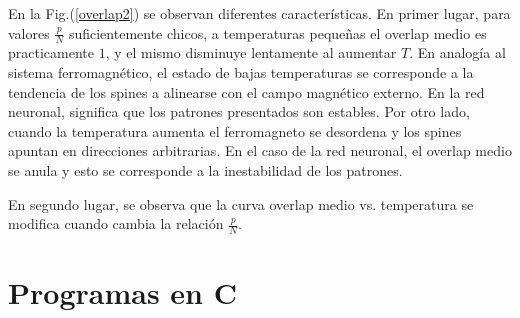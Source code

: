 \documentclass[aps,prb,onecolumn,10pt,floatfix,superscriptaddress]{article} %
\begin{document}
En la Fig.(\ref{overlap2}) se observan diferentes caracter\'isticas. En primer lugar, para valores $\frac{p}{N}$ suficientemente chicos, a temperaturas peque\~nas el overlap medio es practicamente $1$, y el mismo disminuye lentamente al aumentar $T$. En analog\'ia al sistema ferromagn\'etico, el estado de bajas temperaturas se corresponde a la tendencia de los spines a alinearse con el campo magn\'etico externo. En la red neuronal, significa que los patrones presentados son estables. Por otro lado, cuando la temperatura aumenta el ferromagneto se desordena y los spines apuntan en direcciones arbitrarias. En el caso de la red neuronal, el overlap medio se anula y esto se corresponde a la inestabilidad de los patrones.

En segundo lugar, se observa que la curva overlap medio vs. temperatura se modifica cuando cambia la relaci\'on $\frac{p}{N}$. 

\section{Programas en C}
\end{document}
